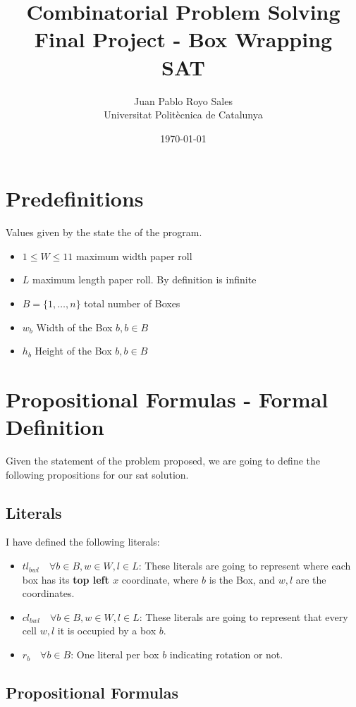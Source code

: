 \documentclass[12pt, a4paper]{article}
\title{%
      Combinatorial Problem Solving \\
      Final Project - Box Wrapping \\
      SAT
}
\author{%
  Juan Pablo Royo Sales \\
  \small{Universitat Politècnica de Catalunya}
}
\date\today
\begin{document}
\maketitle

\tableofcontents

\section{Predefinitions}
Values given by the state the of the program.

\begin{itemize}
  \item $1 \leq W \leq 11$ maximum width paper roll
  \item $L$ maximum length paper roll. By definition is infinite
  \item $B = \{1, \dots, n\}$ total number of Boxes
  \item $w_b$ Width of the Box $b, b \in B$
  \item $h_b$ Height of the Box $b, b \in B$
\end{itemize}

\section{Propositional Formulas - Formal Definition}
Given the statement of the problem proposed, we are going to define the following propositions for our \acrfull{sat} solution.

\subsection{Literals}
I have defined the following literals:

\begin{itemize}
  \item $tl_{bwl} \quad \forall b \in B, w \in W, l \in L$: These literals are going to represent where each box has its \textbf{top left $x$} coordinate, where $b$ is the Box, and $w, l$ are the coordinates.\label{var:tl}
  \item $cl_{bwl} \quad \forall b \in B, w \in W, l \in L$: These literals are going to represent that every cell $w, l$ it is occupied by a box $b$.\label{var:cl}
  \item $r_b \quad \forall b \in B$: One literal per box $b$ indicating rotation or not.\label{var:r}
\end{itemize}

\subsection{Propositional Formulas}\label{sub:form}
\end{document}
